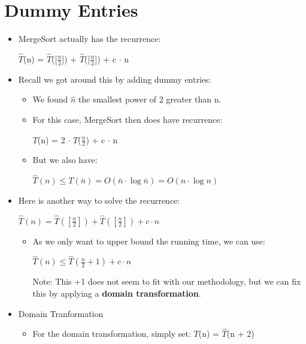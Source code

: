 \documentclass[12pt]{article}
\begin{document}
\section{Dummy Entries}
\renewcommand{\labelitemii}{$\circ$}
\renewcommand{\labelitemiii}{$\cdot$}
\renewcommand{\labelitemiii}{$\rightarrow$}
\renewcommand{\labelitemiv}{$\star$}
\begin{itemize}
\item MergeSort actually has the recurrence:
	\begin{center}
	\large{$\hat{T}$(n) = $\hat{T}$([$\frac{n}{2}$]) + $\hat{T}$([$\frac{n}{2}$]) + c $\cdot$ n}
	\end{center}
\item Recall we got around this by adding dummy entries:
	\begin{itemize}
	\item We found $\hat{n}$ the smallest power of 2 greater than n.
	\item For this case, MergeSort then does have recurrence:
		\begin{center}
		\large{$T$(n) = 2 $\cdot$ $T$($\frac{n}{2}$) + c $\cdot$ n}
		\end{center}
	\item But we also have: 
		\begin{center}
		{\large $\hat{T}(n) \leq T(\bar{n}) = O(\bar{n} \cdot \log{}\bar{n}) = O(n \cdot \log{}n) $}
		\end{center}
	\end{itemize}
\item Here is another way to solve the recurrence:
	\begin{center}
	{\large $\hat{T}(n) = \hat{T}([\frac{n}{2}]) + \hat{T}([\frac{n}{2}]) + c \cdot n$}
	\end{center}
	\begin{itemize}
	\item As we only want to upper bound the running time, we can use:
	\begin{center}
	{\large $\hat{T}(n) \leq \hat{T}(\frac{n}{2} + 1) + c \cdot n$}
	\end{center}
	Note: This +1 does not seem to fit with our methodology, but we can fix this by applying a 			\textbf{domain transformation}.
	\end{itemize}
\item Domain Tranformation
	\begin{itemize}
	\item For the domain transformation, simply set: {\large $T$(n) = $\hat{T}$(n + 2)}

\end{itemize}
\end{itemize}
\end{document}
